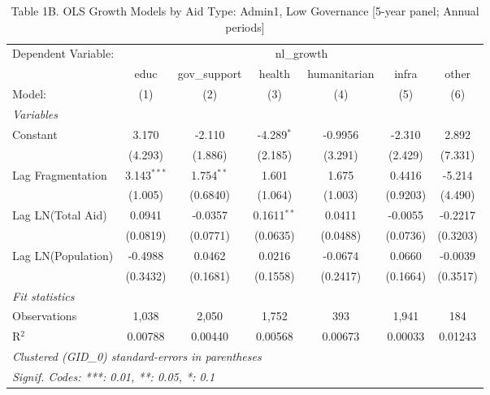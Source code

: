 
\begin{table}[H]
   \caption{Table 1B. OLS Growth Models by Aid Type: Admin1, Low Governance [5-year panel; Annual periods]}
   \centering
   \begin{tabular}{lcccccc}
      \tabularnewline \midrule \midrule
      Dependent Variable: & \multicolumn{6}{c}{nl\_growth}\\
                         & educ          & gov\_support  & health        & humanitarian & infra    & other \\   
      Model:             & (1)           & (2)           & (3)           & (4)          & (5)      & (6)\\  
      \midrule
      \emph{Variables}\\
      Constant           & 3.170         & -2.110        & -4.289$^{*}$  & -0.9956      & -2.310   & 2.892\\   
                         & (4.293)       & (1.886)       & (2.185)       & (3.291)      & (2.429)  & (7.331)\\   
      Lag Fragmentation  & 3.143$^{***}$ & 1.754$^{**}$  & 1.601         & 1.675        & 0.4416   & -5.214\\   
                         & (1.005)       & (0.6840)      & (1.064)       & (1.003)      & (0.9203) & (4.490)\\   
      Lag LN(Total Aid)  & 0.0941        & -0.0357       & 0.1611$^{**}$ & 0.0411       & -0.0055  & -0.2217\\   
                         & (0.0819)      & (0.0771)      & (0.0635)      & (0.0488)     & (0.0736) & (0.3203)\\   
      Lag LN(Population) & -0.4988       & 0.0462        & 0.0216        & -0.0674      & 0.0660   & -0.0039\\   
                         & (0.3432)      & (0.1681)      & (0.1558)      & (0.2417)     & (0.1664) & (0.3517)\\   
      \midrule
      \emph{Fit statistics}\\
      Observations       & 1,038         & 2,050         & 1,752         & 393          & 1,941    & 184\\  
      R$^2$              & 0.00788       & 0.00440       & 0.00568       & 0.00673      & 0.00033  & 0.01243\\  
      \midrule \midrule
      \multicolumn{7}{l}{\emph{Clustered (GID\_0) standard-errors in parentheses}}\\
      \multicolumn{7}{l}{\emph{Signif. Codes: ***: 0.01, **: 0.05, *: 0.1}}\\
   \end{tabular}
\end{table}



